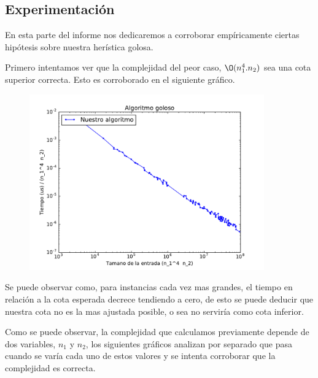 \subsection{Experimentación}

En esta parte del informe nos dedicaremos a corroborar empíricamente ciertas hipótesis sobre nuestra herística golosa.

Primero intentamos ver que la complejidad del peor caso, $\O(n_1^4.n_2)$ sea una cota superior correcta. Esto es corroborado en el siguiente gráfico.

\begin{figure}[H]
 \centering
	\includegraphics[width=0.9\textwidth]{graficos/problema_4/tiempos_1.pdf}
	\caption{}
	\label{fig:problema4-1}
\end{figure}

Se puede observar como, para instancias cada vez mas grandes, el tiempo en relación a la cota esperada decrece tendiendo a cero, de esto se puede deducir que nuestra cota no es la mas ajustada posible, o sea no serviría como cota inferior.

Como se puede observar, la complejidad que calculamos previamente depende de dos variables, $n_1$ y $n_2$, los siguientes gráficos analizan por separado que pasa cuando se varía cada uno de estos valores y se intenta corroborar que la complejidad es correcta.

